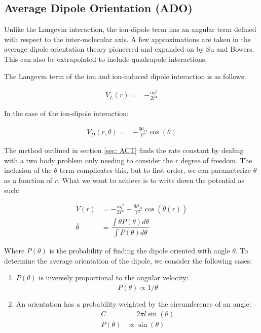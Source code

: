 \subsection{Average Dipole Orientation (ADO)}

Unlike the Langevin interaction, the ion-dipole term has an angular term defined with respect to the inter-molecular axis. A few approximations are taken in the average dipole orientation theory pioneered and expanded on by Su and Bowers.\cite{Su1973, Su1973a} This can also be extrapolated to include quadrupole interactions.\cite{Su1975}

The Langevin term of the ion and ion-induced dipole interaction is as follows:

\begin{align}
	V_L(r)= &-\frac{\alpha q^2}{2r^4}
\end{align}

In the case of the ion-dipole interaction:

\begin{align}
	V_D(r, \theta) = & -\frac{q\mu_D}{r^2} \cos(\theta)
\end{align}

The method outlined in section \ref{sec: ACT} finds the rate constant by dealing with a two body problem only needing to consider the $r$ degree of freedom. The inclusion of the $\theta$ term complicates this, but to first order, we can parameterize $\theta$ as a function of $r$. What we want to achieve is to write down the potential as such:

\begin{align}
    V(r) & = -\frac{\alpha q^2}{2r^4} - \frac{q\mu_D}{r^2} \cos\left(\bar{\theta}(r)\right) \nonumber \\
    \bar{\theta} & = \dfrac{\int \theta P(\theta) d\theta}{\int P(\theta) d\theta} \label{eq: avg theta}
\end{align}

Where $P(\theta)$ is the probability of finding the dipole oriented with angle $\theta$. To determine the average orientation of the dipole, we consider the following cases:

\begin{enumerate}
	\item $P(\theta)$ is inversely proportional to the angular velocity:
	\begin{equation*}
		P(\theta) \propto 1/\dot{\theta}
	\end{equation*}
	\item An orientation has a probability weighted by the circumference of an angle:
	\begin{align*}
		C & = 2\pi l \sin(\theta) \\
		P(\theta) & \propto \sin(\theta)
	\end{align*}
\end{enumerate}

